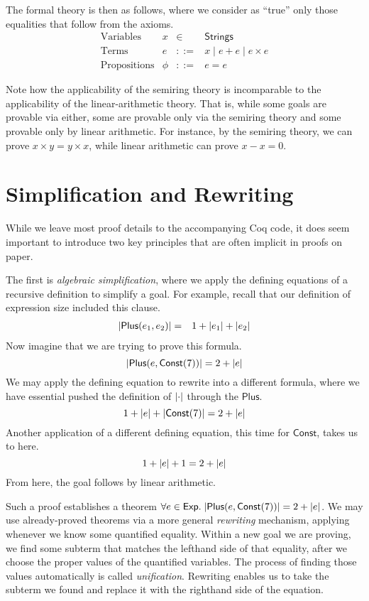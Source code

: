 \documentclass{amsbook}
\theoremstyle{definition}
\theoremstyle{remark}
\numberwithin{section}{chapter}
\numberwithin{equation}{chapter}
\begin{document}
The formal theory is then as follows, where we consider as ``true'' only those equalities that follow from the axioms.
$$\begin{array}{rrcl}
  \textrm{Variables} & x &\in& \mathsf{Strings} \\
  \textrm{Terms} & e &::=& x \mid e + e \mid e \times e \\
  \textrm{Propositions} & \phi &::=& e = e
\end{array}$$

Note how the applicability of the semiring theory is incomparable to the applicability of the linear-arithmetic theory.
That is, while some goals are provable via either, some are provable only via the semiring theory and some provable only by linear arithmetic.
For instance, by the semiring theory, we can prove $x \times y = y \times x$, while linear arithmetic can prove $x - x = 0$.

\section{Simplification and Rewriting}

While we leave most proof details to the accompanying Coq code, it does seem important to introduce two key principles that are often implicit in proofs on paper.

The first is \emph{algebraic simplification}, where we apply the defining equations of a recursive definition to simplify a goal.
For example, recall that our definition of expression size included this clause.
\begin{eqnarray*}
  {\left \lvert \mathsf{Plus}(e_1, e_2) \right \rvert} &=& 1 + {\left \lvert e_1 \right \rvert} + {\left \lvert e_2 \right \rvert}
\end{eqnarray*}
Now imagine that we are trying to prove this formula.
$${\left \lvert \mathsf{Plus}(e, \mathsf{Const}(7)) \right \rvert} = 2 + {\left \lvert e \right \rvert}$$
We may apply the defining equation to rewrite into a different formula, where we have essential pushed the definition of ${\left \lvert \cdot \right \rvert}$ through the $\mathsf{Plus}$.
$$1 + {\left \lvert e \right \rvert} + {\left \lvert \mathsf{Const}(7) \right \rvert} = 2 + {\left \lvert e \right \rvert}$$
Another application of a different defining equation, this time for $\mathsf{Const}$, takes us to here.
$$1 + {\left \lvert e \right \rvert} + 1 = 2 + {\left \lvert e \right \rvert}$$
From here, the goal follows by linear arithmetic.

\medskip

Such a proof establishes a theorem $\forall e \in \mathsf{Exp}. \; {\left \lvert \mathsf{Plus}(e, \mathsf{Const}(7)) \right \rvert} = 2 + {\left \lvert e \right \rvert}$.
We may use already-proved theorems via a more general \emph{rewriting} mechanism, applying whenever we know some quantified equality.
Within a new goal we are proving, we find some subterm that matches the lefthand side of that equality, after we choose the proper values of the quantified variables.
The process of finding those values automatically is called \emph{unification}.
Rewriting enables us to take the subterm we found and replace it with the righthand side of the equation.
\end{document}
